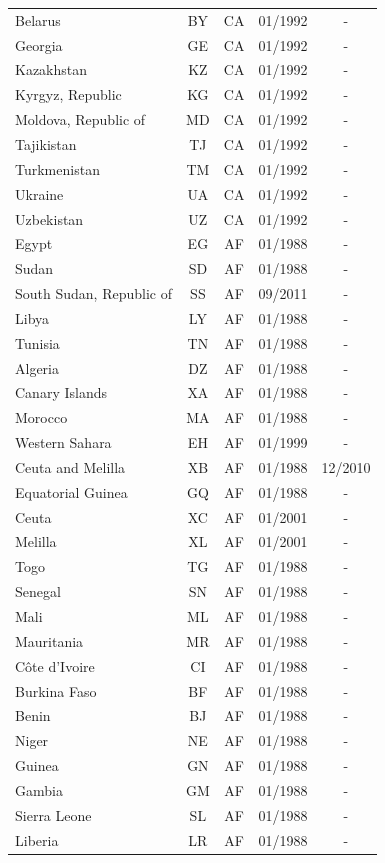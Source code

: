 \begin{small}
\begin{longtable}{p{7.5cm}cccc}
Belarus	&	BY	&	CA	&	01/1992	&	-	\\
Georgia	&	GE	&	CA	&	01/1992	&	-	\\
Kazakhstan	&	KZ	&	CA	&	01/1992	&	-	\\
Kyrgyz, Republic	&	KG	&	CA	&	01/1992	&	-	\\
Moldova, Republic of	&	MD	&	CA	&	01/1992	&	-	\\
Tajikistan	&	TJ	&	CA	&	01/1992	&	-	\\
Turkmenistan	&	TM	&	CA	&	01/1992	&	-	\\
Ukraine	&	UA	&	CA	&	01/1992	&	-	\\
Uzbekistan	&	UZ	&	CA	&	01/1992	&	-	\\
Egypt	&	EG	&	AF	&	01/1988	&	-	\\
Sudan	&	SD	&	AF	&	01/1988	&	-	\\
South Sudan, Republic of	&	SS	&	AF	&	09/2011	&	-	\\
Libya	&	LY	&	AF	&	01/1988	&	-	\\
Tunisia	&	TN	&	AF	&	01/1988	&	-	\\
Algeria	&	DZ	&	AF	&	01/1988	&	-	\\
Canary Islands	&	XA	&	AF	&	01/1988	&	-	\\
Morocco	&	MA	&	AF	&	01/1988	&	-	\\
Western Sahara	&	EH	&	AF	&	01/1999	&	-	\\
Ceuta and Melilla	&	XB	&	AF	&	01/1988	&	12/2010	\\
Equatorial Guinea	&	GQ	&	AF	&	01/1988	&	-	\\
Ceuta	&	XC	&	AF	&	01/2001	&	-	\\
Melilla	&	XL	&	AF	&	01/2001	&	-	\\
Togo	&	TG	&	AF	&	01/1988	&	-	\\
Senegal	&	SN	&	AF	&	01/1988	&	-	\\
Mali	&	ML	&	AF	&	01/1988	&	-	\\
Mauritania	&	MR	&	AF	&	01/1988	&	-	\\
Côte d'Ivoire	&	CI	&	AF	&	01/1988	&	-	\\
Burkina Faso	&	BF	&	AF	&	01/1988	&	-	\\
Benin	&	BJ	&	AF	&	01/1988	&	-	\\
Niger	&	NE	&	AF	&	01/1988	&	-	\\
Guinea	&	GN	&	AF	&	01/1988	&	-	\\
Gambia	&	GM	&	AF	&	01/1988	&	-	\\
Sierra Leone	&	SL	&	AF	&	01/1988	&	-	\\
Liberia	&	LR	&	AF	&	01/1988	&	-	\\

\end{longtable}
\end{small}
